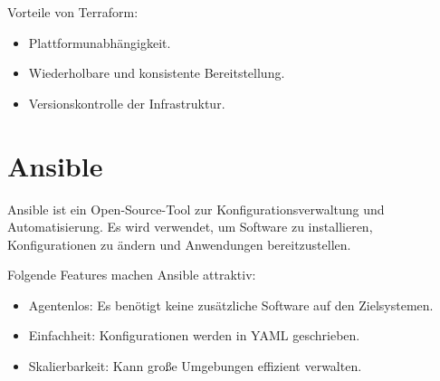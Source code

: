 Vorteile von Terraform:
\begin{itemize}
    \item Plattformunabhängigkeit.
    \item Wiederholbare und konsistente Bereitstellung.
    \item Versionskontrolle der Infrastruktur.
\end{itemize}

\section{Ansible}
Ansible ist ein Open-Source-Tool zur Konfigurationsverwaltung und Automatisierung. Es wird verwendet, um Software zu installieren, Konfigurationen zu ändern und Anwendungen bereitzustellen.

Folgende Features machen Ansible attraktiv:
\begin{itemize}
    \item Agentenlos: Es benötigt keine zusätzliche Software auf den Zielsystemen.
    \item Einfachheit: Konfigurationen werden in YAML geschrieben.
    \item Skalierbarkeit: Kann große Umgebungen effizient verwalten.
\end{itemize}